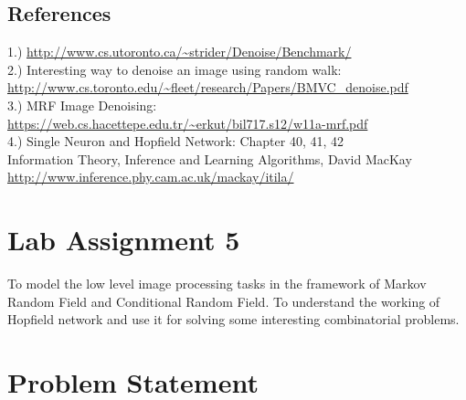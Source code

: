 \documentclass[conference]{IEEEtran}
\begin{document}
\subsection{References}
1.) \url{http://www.cs.utoronto.ca/~strider/Denoise/Benchmark/}\\
2.) Interesting way to denoise an image using random walk: \\
\url{http://www.cs.toronto.edu/~fleet/research/Papers/BMVC_denoise.pdf}\\
3.) MRF Image Denoising: \\
\url{https://web.cs.hacettepe.edu.tr/~erkut/bil717.s12/w11a-mrf.pdf}\\
4.) Single Neuron and Hopfield Network: Chapter 40, 41, 42\\
Information Theory, Inference and Learning Algorithms, David MacKay\\
\url{http://www.inference.phy.cam.ac.uk/mackay/itila/}


\section{Lab Assignment 5}
 To model the low level image processing tasks in the framework of Markov Random Field and Conditional Random Field. To understand the working of Hopfield network and use it for solving some interesting combinatorial problems.


\section{Problem Statement}
\end{document}
